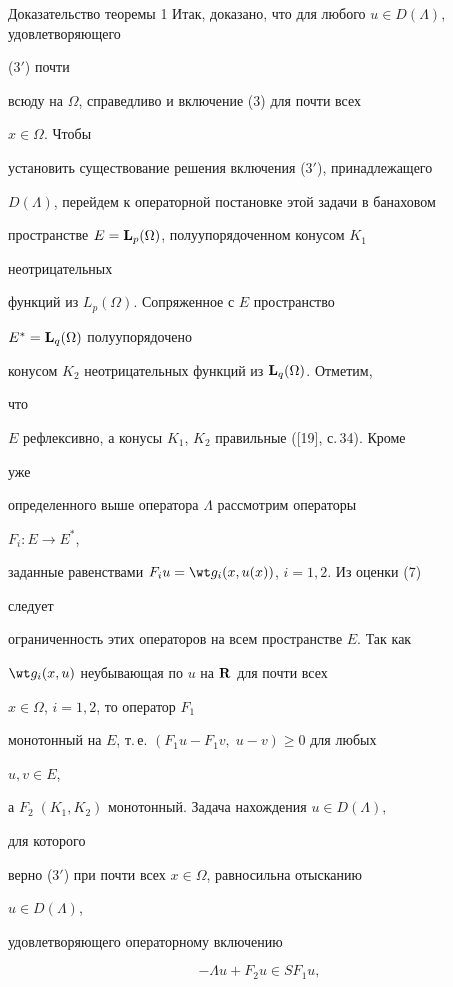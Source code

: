 \begin{pf*}{Доказательство теоремы 1}
Итак, доказано, что для любого $u\in D(\Lambda)$, удовлетворяющего 


(3$'$) почти 


всюду на $\Omega$, справедливо и включение (3) для почти всех 


$x\in\Omega$. Чтобы 


установить существование решения включения (3$'$), принадлежащего 


$D(\Lambda)$, перейдем к операторной постановке этой задачи в банаховом 


пространстве $E=\bold L_p(\Omega)$, полуупорядоченном конусом $K_1$ 


неотрицательных 


функций из $L_p(\Omega)$. Сопряженное с $E$ пространство 


$E^*=\bold L_q(\Omega)$ полуупорядочено 


конусом $K_2$ неотрицательных функций из $\bold L_q(\Omega)$. Отметим, 


что 


$E$ рефлексивно, а конусы $K_1$, $K_2$ правильные ([19], с.\,34). Кроме 


уже 


определенного выше оператора $\Lambda$ рассмотрим операторы 


$F_i:E\to E^*$, 


заданные равенствами $F_i u=\wt g_i(x,u(x))$, $i=1,2$. Из оценки (7) 


следует 


ограниченность этих операторов на всем пространстве $E$. Так как 


$\wt g_i(x,u)$ неубывающая по $u$ на $\bold R$ для почти всех 


$x\in\Omega$, $i=1,2$, то оператор $F_1$ 


монотонный на $E$, т.\,е. $(F_1u-F_1v,\;u-v)\ge 0$ для любых 


$u,v\in E$, 


а $F_2\;(K_1,K_2)$ монотонный. Задача нахождения $u\in D(\Lambda)$, 


для которого 


верно (3$'$) при почти всех $x\in\Omega$, равносильна отысканию


$u\in D(\Lambda)$, 


удовлетворяющего операторному включению 


\begin{equation} 


-\Lambda u+F_2u\in SF_1u, 



\end{equation}
\end{pf*}
